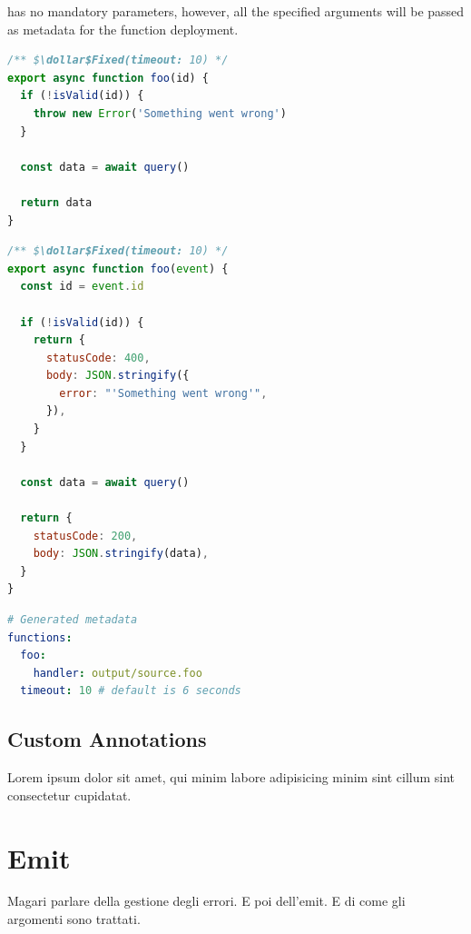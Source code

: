  has no mandatory parameters, however, all the specified arguments will be
passed as metadata for the function deployment.


\begin{lstlisting}[language=javascript, caption={Input code}]
/** $\dollar$Fixed(timeout: 10) */
export async function foo(id) {
  if (!isValid(id)) {
    throw new Error('Something went wrong')
  }

  const data = await query()

  return data
}
\end{lstlisting}


\begin{lstlisting}[language=javascript, caption={Output code}]
/** $\dollar$Fixed(timeout: 10) */
export async function foo(event) {
  const id = event.id

  if (!isValid(id)) {
    return {
      statusCode: 400,
      body: JSON.stringify({
        error: "'Something went wrong'",
      }),
    }
  }

  const data = await query()

  return {
    statusCode: 200,
    body: JSON.stringify(data),
  }
}
\end{lstlisting}

\begin{lstlisting}[language=yaml, caption={Generated Metadata through \annotation{$\dollar$Fixed}}]
# Generated metadata
functions:
  foo:
    handler: output/source.foo
  timeout: 10 # default is 6 seconds
\end{lstlisting}

\subsection{Custom Annotations}

Lorem ipsum dolor sit amet, qui minim labore adipisicing minim sint cillum sint consectetur cupidatat.

\section{Emit}

Magari parlare della gestione degli errori. E poi dell'emit.
E di come gli argomenti sono trattati.
